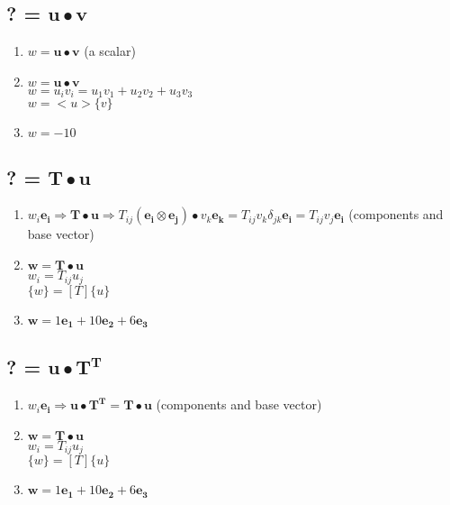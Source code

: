 \documentclass[10pt, letterpaper]{article}
\begin{document}
	\subsection{? = $\bm{u} \bullet \bm{v}$}
		\begin{enumerate}[label = (\roman*)]
			\item $w = \bm{u} \bullet \bm{v}$ (a scalar)
			\item $w = \bm{u} \bullet \bm{v}$\\
				$w = u_i v_i = u_1 v_1 + u_2 v_2 + u_3 v_3 $\\
				$w = <u> \{v\}$
			\item $w = -10$
		\end{enumerate}
		
	\subsection{? = $\bm{T} \bullet \bm{u}$}
		\begin{enumerate}[label = (\roman*)]
			\item $w_i \bm{e_i} \Rightarrow \bm{T} \bullet \bm{u} \Rightarrow
				T_{ij}(\bm{e_i} \otimes \bm{e_j}) \bullet v_k \bm{e_k}
							= T_{ij}v_k \delta_{jk} \bm{e_i} = T_{ij}v_j \bm{e_i}$ (components and base vector)
			\item $\bm{w} = \bm{T} \bullet \bm{u}$ \\
				 $w_i = T_{ij} u_j$\\				 			
				$\{w\} = [T] \{u\}$
			\item $\bm{w} = 1 \bm{e_1} + 10 \bm{e_2} + 6 \bm{e_3}$
		\end{enumerate}		

	\subsection{? = $\bm{u} \bullet \bm{T^T}$}
		\begin{enumerate}[label = (\roman*)]
			\item $w_i \bm{e_i} \Rightarrow \bm{u} \bullet \bm{T^T} = \bm{T} \bullet \bm{u}$ (components and base vector)
			\item $\bm{w} = \bm{T} \bullet \bm{u}$ \\
				 $w_i = T_{ij} u_j$\\				 			
				$\{w\} = [T] \{u\}$
			\item $\bm{w} = 1 \bm{e_1} + 10 \bm{e_2} + 6 \bm{e_3}$
		\end{enumerate}		
\end{document}
